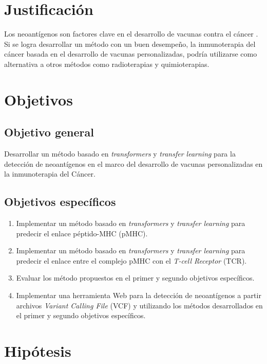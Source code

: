 \documentclass[a4paper]{article}
\begin{document}
\section{Justificación}

Los neoantígenos son factores clave en el desarrollo de vacunas contra el cáncer  \citep{borden2022cancer,chen2021challenges,gopanenko2020main}. Si se logra desarrollar un método con un buen desempeño, la inmunoterapia del cáncer basada en el desarrollo de vacunas personalizadas, podría utilizarse como alternativa a otros métodos como radioterapias y quimioterapias. 



	
\section{Objetivos}
	
	\subsection{Objetivo general}
	
	Desarrollar un método basado en \textit{transformers} y \textit{transfer learning} para la detección de neoantígenos en el marco del desarrollo de vacunas personalizadas en la inmunoterapia del Cáncer.
	
	\subsection{Objetivos específicos}
	\begin{enumerate}
		\item Implementar un método basado en \textit{transformers} y \textit{transfer learning} para predecir el enlace péptido-MHC (pMHC).
		\item Implementar un método basado en \textit{transformers} y \textit{transfer learning} para predecir el enlace entre el complejo pMHC con el \textit{T-cell Receptor} (TCR).
		\item Evaluar los método propuestos en el primer y segundo objetivos específicos.
		\item Implementar una herramienta Web para la detección de neoantígenos a partir archivos \textit{Variant Calling File} (VCF) y utilizando los métodos desarrollados en el primer y segundo objetivos específicos.

		

		
	\end{enumerate}

	
\section{Hipótesis}
\end{document}
